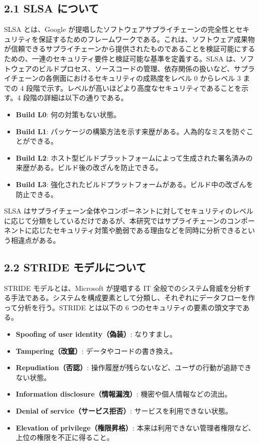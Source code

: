 \documentclass[paper]{ieicej} %
\begin{document}
\subsection{2.1 SLSA について}
SLSA とは、Google が提唱したソフトウェアサプライチェーンの完全性とセキュリティを保証するためのフレームワークである。これは、ソフトウェア成果物が信頼できるサプライチェーンから提供されたものであることを検証可能にするための、一連のセキュリティ要件と検証可能な基準を定義する。SLSA は、ソフトウェアのビルドプロセス、ソースコードの管理、依存関係の扱いなど、サプライチェーンの各側面におけるセキュリティの成熟度をレベル 0 からレベル 3 までの 4 段階で示す。レベルが高いほどより高度なセキュリティであることを示す。4 段階の詳細は以下の通りである。

\begin{itemize}
    \item \textbf{Build L0}: 何の対策もない状態。
    \item \textbf{Build L1}: パッケージの構築方法を示す来歴がある。人為的なミスを防ぐことができる。
    \item \textbf{Build L2}: ホスト型ビルドプラットフォームによって生成された署名済みの来歴がある。ビルド後の改ざんを防止できる。
    \item \textbf{Build L3}: 強化されたビルドプラットフォームがある。ビルド中の改ざんを防止できる。
\end{itemize}

SLSA はサプライチェーン全体やコンポーネントに対してセキュリティのレベルに応じて分類をしているだけであるが、本研究ではサプライチェーンのコンポーネントに応じたセキュリティ対策や脆弱である理由などを同時に分析できるという相違点がある。

\subsection{2.2 STRIDE モデルについて}
STRIDE モデルとは、Microsoft が提唱する IT 全般でのシステム脅威を分析する手法である。システムを構成要素として分類し、それぞれにデータフローを作って分析を行う。STRIDE とは以下の 6 つのセキュリティの要素の頭文字である。

\begin{itemize}
    \item \textbf{Spoofing of user identity（偽装）}: なりすまし。
    \item \textbf{Tampering（改竄）}: データやコードの書き換え。
    \item \textbf{Repudiation（否認）}: 操作履歴が残らないなど、ユーザの行動が追跡できない状態。
    \item \textbf{Information disclosure（情報漏洩）}: 機密や個人情報などの流出。
    \item \textbf{Denial of service（サービス拒否）}: サービスを利用できない状態。
    \item \textbf{Elevation of privilege（権限昇格）}: 本来は利用できない管理者権限など、上位の権限を不正に得ること。
\end{itemize}
\end{document}
